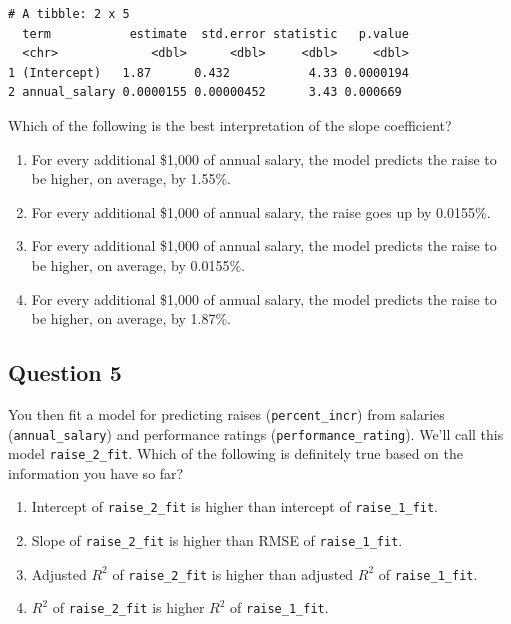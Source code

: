 \documentclass[
  letterpaper,
  DIV=11,
  numbers=noendperiod]{scrartcl}
\providecommand{\tightlist}{%
  \setlength{\itemsep}{0pt}\setlength{\parskip}{0pt}}\usepackage{longtable,booktabs,array}
\begin{document}
\begin{verbatim}
# A tibble: 2 x 5
  term           estimate  std.error statistic   p.value
  <chr>             <dbl>      <dbl>     <dbl>     <dbl>
1 (Intercept)   1.87      0.432           4.33 0.0000194
2 annual_salary 0.0000155 0.00000452      3.43 0.000669 
\end{verbatim}

Which of the following is the best interpretation of the slope
coefficient?

\begin{enumerate}
\def\labelenumi{\alph{enumi}.}
\tightlist
\item
  For every additional \$1,000 of annual salary, the model predicts the
  raise to be higher, on average, by 1.55\%.
\item
  For every additional \$1,000 of annual salary, the raise goes up by
  0.0155\%.
\item
  For every additional \$1,000 of annual salary, the model predicts the
  raise to be higher, on average, by 0.0155\%.
\item
  For every additional \$1,000 of annual salary, the model predicts the
  raise to be higher, on average, by 1.87\%.
\end{enumerate}

\hypertarget{question-5}{%
\subsection{Question 5}\label{question-5}}

You then fit a model for predicting raises (\texttt{percent\_incr}) from
salaries (\texttt{annual\_salary}) and performance ratings
(\texttt{performance\_rating}). We'll call this model
\texttt{raise\_2\_fit}. Which of the following is definitely true based
on the information you have so far?

\begin{enumerate}
\def\labelenumi{\alph{enumi}.}
\tightlist
\item
  Intercept of \texttt{raise\_2\_fit} is higher than intercept of
  \texttt{raise\_1\_fit}.
\item
  Slope of \texttt{raise\_2\_fit} is higher than RMSE of
  \texttt{raise\_1\_fit}.
\item
  Adjusted \(R^2\) of \texttt{raise\_2\_fit} is higher than adjusted
  \(R^2\) of \texttt{raise\_1\_fit}.
\item
  \(R^2\) of \texttt{raise\_2\_fit} is higher \(R^2\) of
  \texttt{raise\_1\_fit}.
\end{enumerate}
\end{document}
